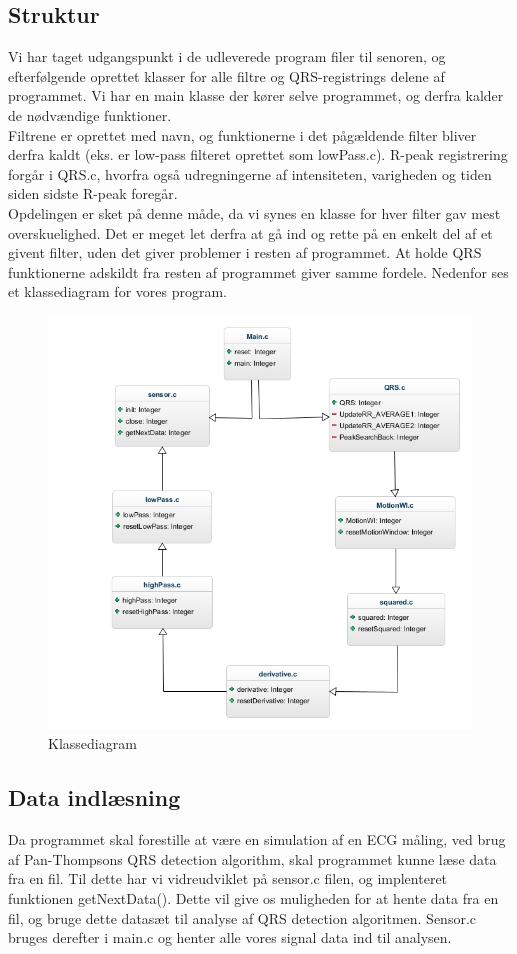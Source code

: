 \documentclass[a4paper,12pt]{article}
\begin{document}
\subsection*{Struktur}
Vi har taget udgangspunkt i de udleverede program filer til senoren, og efterfølgende oprettet klasser for alle filtre og QRS-registrings delene af programmet. Vi har en main klasse der kører selve programmet, og derfra kalder de nødvændige funktioner.\\
Filtrene er oprettet med navn, og funktionerne i det pågældende filter bliver derfra kaldt (eks. er low-pass filteret oprettet som lowPass.c). R-peak registrering forgår i QRS.c, hvorfra også udregningerne af intensiteten, varigheden og tiden siden sidste R-peak foregår.\\
Opdelingen er sket på denne måde, da vi synes en klasse for hver filter gav mest overskuelighed. Det er meget let derfra at gå ind og rette på en enkelt del af et givent filter, uden det giver problemer i resten af programmet. At holde QRS funktionerne adskildt fra resten af programmet giver samme fordele. Nedenfor ses et klassediagram for vores program.
\begin{figure}[htpb]
\centering
\includegraphics[scale=0.5]{fisse.jpg}
\caption{Klassediagram}
\label{Figur 2. Klassediagram}
\end{figure}
\newpage
\subsection{Data indlæsning}
Da programmet skal forestille at være en simulation af en ECG måling, ved brug af Pan-Thompsons QRS detection algorithm, skal programmet kunne læse data fra en fil. Til dette har vi vidreudviklet på sensor.c filen, og implenteret funktionen getNextData(). Dette vil give os muligheden for at hente data fra en fil, og bruge dette datasæt til analyse af QRS detection algoritmen. Sensor.c bruges derefter i main.c og henter alle vores signal data ind til analysen.
\end{document}
